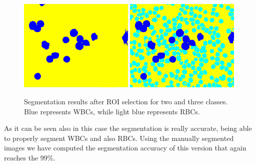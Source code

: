 \documentclass[final,a4paper,12pt,english]{UnicaPhdThesis3}
\begin{document}
\begin{figure}[!t]
	\centering
	\includegraphics[width=0.49\textwidth]{images/2015_1_caip/ROI4}
	\includegraphics[width=0.49\textwidth]{images/2015_1_caip/ROI5}
	\caption{\label{fig:ex7}Segmentation results after ROI selection for two and three classes. Blue represents WBCs, while light blue represents RBCs.}
\end{figure}

As it can be seen also in this case the segmentation is really accurate, being able to properly segment WBCs and also RBCs. Using the manually segmented images we have computed the segmentation accuracy of this version that again reaches the 99\%. 
\end{document}
